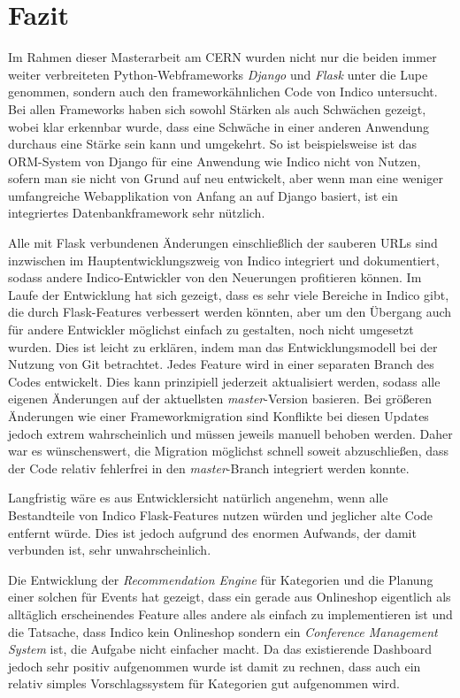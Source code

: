 \chapter{Fazit}

Im Rahmen dieser Masterarbeit am CERN wurden nicht nur die beiden immer weiter verbreiteten
Python-Webframeworks \emph{Django} und \emph{Flask} unter die Lupe genommen, sondern auch den
frameworkähnlichen Code von Indico untersucht. Bei allen Frameworks haben sich sowohl Stärken als
auch Schwächen gezeigt, wobei klar erkennbar wurde, dass eine Schwäche in einer anderen Anwendung
durchaus eine Stärke sein kann und umgekehrt. So ist beispielsweise ist das ORM-System von Django
für eine Anwendung wie Indico nicht von Nutzen, sofern man sie nicht von Grund auf neu entwickelt,
aber wenn man eine weniger umfangreiche Webapplikation von Anfang an auf Django basiert, ist ein
integriertes Datenbankframework sehr nützlich.

Alle mit Flask verbundenen Änderungen einschließlich der sauberen URLs sind inzwischen im
Hauptentwicklungszweig von Indico integriert und dokumentiert, sodass andere Indico-Entwickler von
den Neuerungen profitieren können. Im Laufe der Entwicklung hat sich gezeigt, dass es sehr viele
Bereiche in Indico gibt, die durch Flask-Features verbessert werden könnten, aber um den Übergang
auch für andere Entwickler möglichst einfach zu gestalten, noch nicht umgesetzt wurden. Dies ist
leicht zu erklären, indem man das Entwicklungsmodell bei der Nutzung von Git betrachtet. Jedes
Feature wird in einer separaten Branch des Codes entwickelt. Dies kann prinzipiell jederzeit
aktualisiert werden, sodass alle eigenen Änderungen auf der aktuellsten \emph{master}-Version
basieren. Bei größeren Änderungen wie einer Frameworkmigration sind Konflikte bei diesen Updates
jedoch extrem wahrscheinlich und müssen jeweils manuell behoben werden. Daher war es wünschenswert,
die Migration möglichst schnell soweit abzuschließen, dass der Code relativ fehlerfrei in den
\emph{master}-Branch integriert werden konnte.

Langfristig wäre es aus Entwicklersicht natürlich angenehm, wenn alle Bestandteile von Indico
Flask-Features nutzen würden und jeglicher alte Code entfernt würde. Dies ist jedoch aufgrund des
enormen Aufwands, der damit verbunden ist, sehr unwahrscheinlich.

Die Entwicklung der \emph{Recommendation Engine} für Kategorien und die Planung einer solchen für
Events hat gezeigt, dass ein gerade aus Onlineshop eigentlich als alltäglich erscheinendes Feature
alles andere als einfach zu implementieren ist und die Tatsache, dass Indico kein Onlineshop sondern
ein \emph{Conference Management System} ist, die Aufgabe nicht einfacher macht. Da das existierende
Dashboard jedoch sehr positiv aufgenommen wurde ist damit zu rechnen, dass auch ein relativ simples
Vorschlagssystem für Kategorien gut aufgenommen wird.

